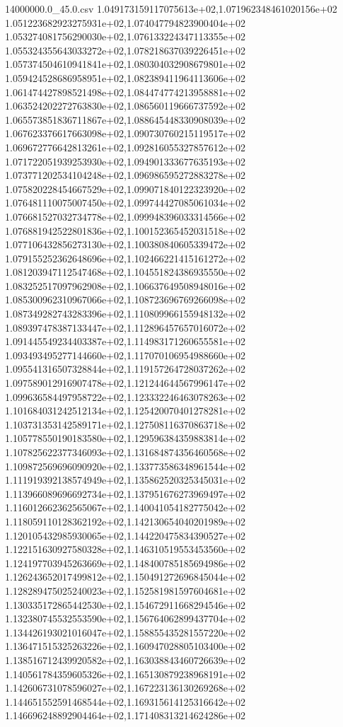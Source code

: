 \begin{filecontents*}{14000000.0_45.0.csv}
1.049173159117075613e+02,1.071962348461020156e+02
1.051223682923275931e+02,1.074047794823900404e+02
1.053274081756290030e+02,1.076133224347113355e+02
1.055324355643033272e+02,1.078218637039226451e+02
1.057374504610941841e+02,1.080304032908679801e+02
1.059424528686958951e+02,1.082389411964113606e+02
1.061474427898521498e+02,1.084474774213958881e+02
1.063524202272763830e+02,1.086560119666737592e+02
1.065573851836711867e+02,1.088645448330908039e+02
1.067623376617663098e+02,1.090730760215119517e+02
1.069672776642813261e+02,1.092816055327857612e+02
1.071722051939253930e+02,1.094901333677635193e+02
1.073771202534104248e+02,1.096986595272883278e+02
1.075820228454667529e+02,1.099071840122323920e+02
1.076481110075007450e+02,1.099744427085061034e+02
1.076681527032734778e+02,1.099948396033314566e+02
1.076881942522801836e+02,1.100152365452031518e+02
1.077106432856273130e+02,1.100380840605339472e+02
1.079155252362648696e+02,1.102466221415161272e+02
1.081203947112547468e+02,1.104551824386935550e+02
1.083252517097962908e+02,1.106637649508948016e+02
1.085300962310967066e+02,1.108723696769266098e+02
1.087349282743283396e+02,1.110809966155948132e+02
1.089397478387133447e+02,1.112896457657016072e+02
1.091445549234403387e+02,1.114983171260655581e+02
1.093493495277144660e+02,1.117070106954988660e+02
1.095541316507328844e+02,1.119157264728037262e+02
1.097589012916907478e+02,1.121244644567996147e+02
1.099636584497958722e+02,1.123332246463078263e+02
1.101684031242512134e+02,1.125420070401278281e+02
1.103731353142589171e+02,1.127508116370863718e+02
1.105778550190183580e+02,1.129596384359883814e+02
1.107825622377346093e+02,1.131684874356460568e+02
1.109872569696090920e+02,1.133773586348961544e+02
1.111919392138574949e+02,1.135862520325345031e+02
1.113966089696692734e+02,1.137951676273969497e+02
1.116012662362565067e+02,1.140041054182775042e+02
1.118059110128362192e+02,1.142130654040201989e+02
1.120105432985930065e+02,1.144220475834390527e+02
1.122151630927580328e+02,1.146310519553453560e+02
1.124197703945263669e+02,1.148400785185694986e+02
1.126243652017499812e+02,1.150491272696845044e+02
1.128289475025240023e+02,1.152581981597604681e+02
1.130335172865442530e+02,1.154672911668294546e+02
1.132380745532553590e+02,1.156764062899437704e+02
1.134426193021016047e+02,1.158855435281557220e+02
1.136471515325263226e+02,1.160947028805103400e+02
1.138516712439920582e+02,1.163038843460726639e+02
1.140561784359605326e+02,1.165130879238968191e+02
1.142606731078596027e+02,1.167223136130269268e+02
1.144651552591468544e+02,1.169315614125316642e+02
1.146696248892904464e+02,1.171408313214624286e+02

\end{filecontents*}
